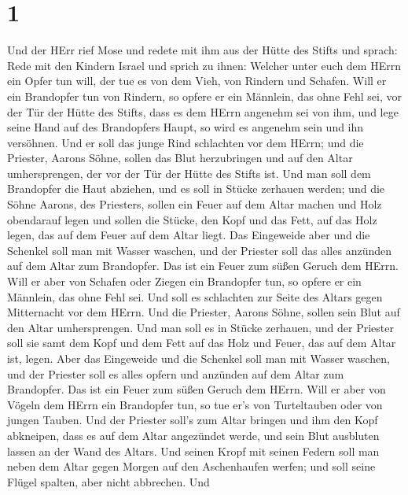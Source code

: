 \hypertarget{section}{%
\section{1}\label{section}}

 Und der HErr rief Mose und redete mit ihm aus der Hütte des
Stifts und sprach:  Rede mit den Kindern Israel und sprich
zu ihnen: Welcher unter euch dem HErrn ein Opfer tun will, der tue es
von dem Vieh, von Rindern und Schafen.  Will er ein
Brandopfer tun von Rindern, so opfere er ein Männlein, das ohne Fehl
sei, vor der Tür der Hütte des Stifts, dass es dem HErrn angenehm sei
von ihm,  und lege seine Hand auf des Brandopfers Haupt, so
wird es angenehm sein und ihn versöhnen.  Und er soll das
junge Rind schlachten vor dem HErrn; und die Priester, Aarons Söhne,
sollen das Blut herzubringen und auf den Altar umhersprengen, der vor
der Tür der Hütte des Stifts ist.  Und man soll dem
Brandopfer die Haut abziehen, und es soll in Stücke zerhauen werden;
 und die Söhne Aarons, des Priesters, sollen ein Feuer auf
dem Altar machen und Holz obendarauf legen  und sollen die
Stücke, den Kopf und das Fett, auf das Holz legen, das auf dem Feuer auf
dem Altar liegt.  Das Eingeweide aber und die Schenkel soll
man mit Wasser waschen, und der Priester soll das alles anzünden auf dem
Altar zum Brandopfer. Das ist ein Feuer zum süßen Geruch dem HErrn.
 Will er aber von Schafen oder Ziegen ein Brandopfer tun,
so opfere er ein Männlein, das ohne Fehl sei.  Und soll es
schlachten zur Seite des Altars gegen Mitternacht vor dem HErrn. Und die
Priester, Aarons Söhne, sollen sein Blut auf den Altar umhersprengen.
 Und man soll es in Stücke zerhauen, und der Priester soll
sie samt dem Kopf und dem Fett auf das Holz und Feuer, das auf dem Altar
ist, legen.  Aber das Eingeweide und die Schenkel soll man
mit Wasser waschen, und der Priester soll es alles opfern und anzünden
auf dem Altar zum Brandopfer. Das ist ein Feuer zum süßen Geruch dem
HErrn.  Will er aber von Vögeln dem HErrn ein Brandopfer
tun, so tue er's von Turteltauben oder von jungen Tauben. 
Und der Priester soll's zum Altar bringen und ihm den Kopf abkneipen,
dass es auf dem Altar angezündet werde, und sein Blut ausbluten lassen
an der Wand des Altars.  Und seinen Kropf mit seinen Federn
soll man neben dem Altar gegen Morgen auf den Aschenhaufen werfen;
 und soll seine Flügel spalten, aber nicht abbrechen. Und
